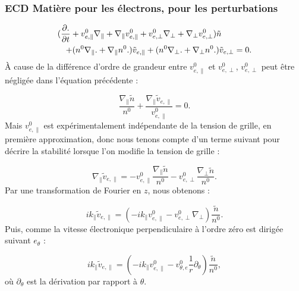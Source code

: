\documentclass{book}
\begin{document}
\subsubsection{ECD Mati\`ere pour les \'electrons,  pour les perturbations }

\begin{eqnarray}
\lefteqn{(\frac{\partial .}{\partial t}
+v^0_{e,\parallel}\nabla_\parallel 
+\nabla_\parallel v^0_{e,\parallel}
+v^0_{e,\perp}\nabla_\perp
+\nabla_\perp v^0_{e,\perp}     )         \tilde{n}}\nonumber\\
&&+(n^0\nabla_\parallel.+\nabla_\parallel n^0.)\tilde{v}_{e,\parallel}
+(n^0\nabla_\perp.+\nabla_\perp n^0.)\tilde{v}_{e,\perp}=0.
\end{eqnarray}
\`A cause de la diff\'erence d'ordre de grandeur entre
$v^0_{e,\parallel}$ 
et  $v_{e,\perp}^0$, $v_{e,\perp}^0$ peut \^etre n\'eglig\'ee dans
l'\'equation 
pr\'ec\'edente :


\begin{equation}
\frac{\nabla_\parallel \tilde{n}}{n^0}
+\frac{\nabla_\parallel\tilde{v}_{e,\parallel}}{v^0_{e,\parallel}}=0.
\end{equation}
Mais $v^0_{e,\parallel}$ est exp\'erimentalement ind\'ependante de la
tension de grille, en premi\`ere approximation, donc nous tenons compte
d'un terme suivant pour d\'ecrire la stabilit\'e
 lorsque l'on modifie la
tension de grille :

\begin{equation}
\nabla _\parallel \tilde v_{e,\parallel}
=-v^0_{e,\parallel}\frac{\nabla_\parallel \tilde{n}}{n^0}
- v^0_{e,\perp}\frac{\nabla_\perp \tilde{n}}{n^0}.
\end{equation}
Par une transformation de Fourier en $z$, nous obtenons :

\begin{equation}
i k_\parallel\tilde v_{e,\parallel}=
(-i k_\parallel v^0_{e,\parallel}-v^0_{e,\perp}\nabla_\perp )
\frac{\tilde n}{n^0}.
\end{equation}
Puis, comme la vitesse \'electronique perpendiculaire \`a l'ordre
z\'ero est dirig\'ee suivant $e_\theta$ :

\begin{equation}\label{ecep}
i k_\parallel\tilde v_{e,\parallel}=
(-i k_\parallel
v^0_{e,\parallel}-v^0_{\theta,e}\frac{1}{r}\partial_\theta) 
\frac{\tilde n}{n^0},
\end{equation}
o\`u $\partial_\theta$ est la d\'erivation par rapport \`a $\theta$.
\end{document}

